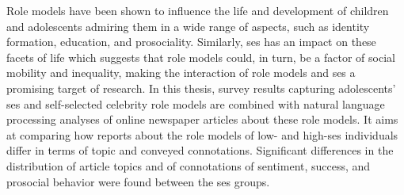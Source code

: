 Role models have been shown to influence the life and development of children and adolescents admiring them in a wide range of aspects, such as identity formation, education, and prosociality. Similarly, \gls{ses} has an impact on these facets of life which suggests that role models could, in turn, be a factor of social mobility and inequality, making the interaction of role models and \gls{ses} a promising target of research. In this thesis, survey results capturing adolescents' \gls{ses} and self-selected celebrity role models are combined with natural language processing analyses of online newspaper articles about these role models. It aims at comparing how reports about the role models of low- and high-\gls{ses} individuals differ in terms of topic and conveyed connotations. Significant differences in the distribution of article topics and of connotations of sentiment, success, and prosocial behavior were found between the \gls{ses} groups.


\glsresetall